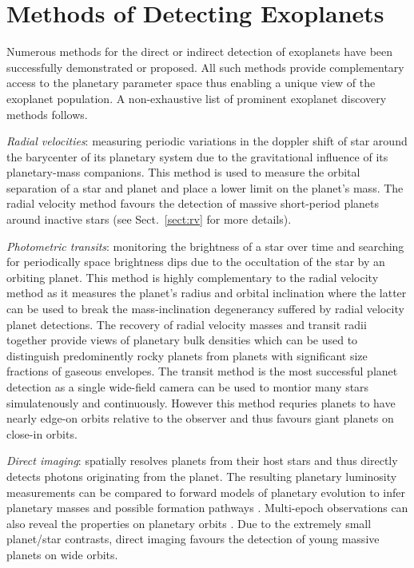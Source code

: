 \section{Methods of Detecting Exoplanets} \label{sect:detection}
Numerous methods for the direct or indirect detection of exoplanets
have been successfully demonstrated or proposed. All such methods provide complementary
access to the planetary parameter space thus enabling a unique view of the exoplanet
population. A non-exhaustive list of prominent exoplanet discovery methods follows.

\emph{Radial velocities}: measuring periodic variations in the doppler shift of star
around the barycenter of its planetary system due to the gravitational influence of
its planetary-mass companions. This method is used to measure the orbital separation of a
star and planet and place a lower limit on the planet's mass. The radial velocity
method favours the detection of massive short-period planets around inactive stars
(see Sect.~\ref{sect:rv} for more details).

\emph{Photometric transits}: monitoring the brightness of a star over time and
searching for periodically space brightness dips due to the occultation of the star
by an orbiting planet. This method is highly complementary to the radial velocity method
as it measures the planet's radius and orbital inclination where the latter can be
used to break the mass-inclination degenerancy suffered by radial velocity planet
detections. The recovery of radial velocity masses and transit radii together provide
views of planetary bulk densities which can be used to distinguish predominently
rocky planets from planets with significant size fractions of gaseous envelopes.
The transit method is the most successful planet detection as a single
wide-field camera can be used to montior many stars simulatenously and continuously.
However this method requries planets to have nearly edge-on orbits relative to the observer
and thus favours giant planets on close-in orbits.

\emph{Direct imaging}: spatially resolves planets from their host stars and thus
directly detects photons originating from the planet. The resulting planetary luminosity
measurements can be compared to forward models of planetary
evolution to infer planetary masses and possible formation pathways \citep{marley07}.
Multi-epoch observations can also reveal the properties on planetary orbits \citep{wang18}.
Due to the extremely small planet/star contrasts, direct imaging favours the detection
of young massive planets on wide orbits.


